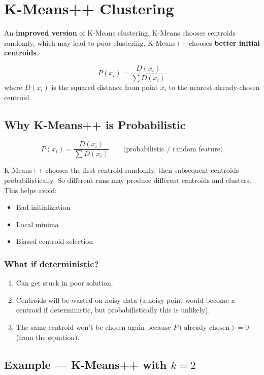 \documentclass[12pt,a4paper]{article}
\begin{document}
\section{K-Means++ Clustering}

\begin{definitionbox}[K-Means++]
An \textbf{improved version} of K-Means clustering. K-Means chooses centroids randomly, which may lead to poor clustering. K-Means++ chooses \textbf{better initial centroids}.

\[
P(x_i) = \frac{D(x_i)}{\sum D(x_i)}
\]
where $D(x_i)$ is the squared distance from point $x_i$ to the nearest already-chosen centroid.
\end{definitionbox}

\subsection{Why K-Means++ is Probabilistic}

\[
P(x_i) = \frac{D(x_i)}{\sum D(x_i)} \qquad \text{(probabilistic / random feature)}
\]

K-Means++ chooses the first centroid randomly, then subsequent centroids probabilistically. So different runs may produce different centroids and clusters. This helps avoid:
\begin{itemize}
  \item Bad initialization
  \item Local minima
  \item Biased centroid selection
\end{itemize}

\subsubsection{What if deterministic?}
\begin{enumerate}
  \item Can get stuck in poor solution.
  \item Centroids will be wasted on noisy data (a noisy point would become a centroid if deterministic, but probabilistically this is unlikely).
  \item The same centroid won't be chosen again because $P(\text{already chosen}) = 0$ (from the equation).
\end{enumerate}

\subsection{Example --- K-Means++ with $k=2$}
\end{document}

